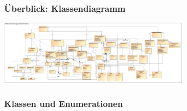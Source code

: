\documentclass[a4paper]{article}
\begin{document}
\subsubsection{Überblick: Klassendiagramm}

\includegraphics[width=350px]{analyse-klassendiagramm.jpg}

\subsubsection{Klassen und Enumerationen}
\end{document}
